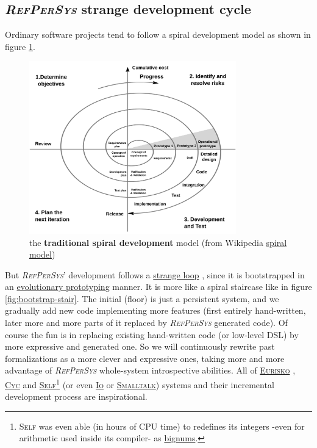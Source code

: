 \documentclass[11pt,a4paper,svgnames]{article}
\newcommand{\RefPerSys}{{\textit{\textsc{RefPerSys}}}}
\begin{document}
\subsection{{\RefPerSys} strange development cycle}
\label{subsec:strange-devel}

Ordinary software projects tend to follow a spiral development model
\cite{boehm:1988:spiral} as shown in figure \ref{fig:tradspiral}.
%
\begin{figure}[h]
  \begin{center}
    \includegraphics[width=0.8\textwidth]{spiral-model-softdevel}
  \end{center}
  \caption{the \textbf{traditional spiral development} model (from Wikipedia \href{https://en.wikipedia.org/wiki/Spiral_model}{spiral model})}
  \label{fig:tradspiral}
\end{figure}
%
But \RefPerSys' development follows a
\href{https://en.wikipedia.org/wiki/Strange_loop}{strange loop}
\cite{hofstadter:2007:strange-loop}, since it is bootstrapped in an
\href{https://en.wikipedia.org/wiki/Software\_prototyping\#Evolutionary\_prototyping}{evolutionary
  prototyping} manner. It is more like a spiral staircase like in
figure \ref{fig:bootstrap-stair}. The initial (floor) is just a
persistent system, and we gradually add new code implementing more
features (first entirely hand-written, later more and more parts of it
replaced by {\RefPerSys} generated code). Of course the fun is in
replacing existing hand-written code (or low-level DSL) by more
expressive and generated one. So we will continuously rewrite past
formalizations as a more clever and expressive ones, taking more and
more advantage of {\RefPerSys} whole-system introspective abilities.
All of \href{https://en.wikipedia.org/wiki/Eurisko}{\textsc{Eurisko}}
\cite{Lenat:1983:Eurisko},
\href{https://en.wikipedia.org/wiki/Cyc}{\textsc{Cyc}}
\cite{Lenat:1991:ev-cycl} and
\href{https://en.wikipedia.org/wiki/Self\_(programming_language)}{\textsc{Self}}\footnote{\textsc{Self}
was even able (in hours of CPU time) to redefines its integers -even
for arithmetic used inside its compiler- as
\href{https://en.wikipedia.org/wiki/Arbitrary-precision_arithmetic}{bignums}.}
\cite{chambers:1991:efficient} (or even
\href{https://iolanguage.org/}{\textsc{Io}} or
\href{https://en.wikipedia.org/wiki/Smalltalk}{\textsc{Smalltalk}})
systems and their incremental development process are inspirational.
\end{document}
